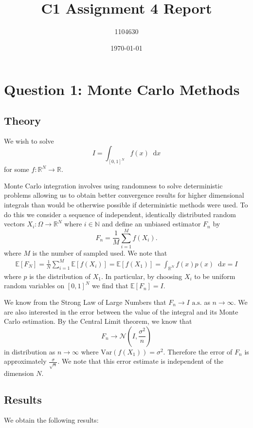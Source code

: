 \documentclass[letterpaper,12pt]{article}
\newcommand{\R}{\ensuremath{\mathbb{R}}}
\newcommand{\N}{\mathbb{N}}
\newcommand{\E}{\mathbb{E}}
\newcommand*{\diff}{\mathop{}\!\mathrm{d}}
\begin{document}
\title{C1 Assignment 4 Report}
\author{1104630}
\date{\today}
\maketitle


\section{Question 1: Monte Carlo Methods}

\subsection{Theory}

We wish to solve
\[
I = \int_{[ 0 , 1 ] ^N} f(x) \diff x
\]
for some $f : \R^N \to \R$.

Monte Carlo integration involves using randomness to solve deterministic problems allowing us to obtain better convergence results for higher dimensional integrals than would be otherwise possible if deterministic methods were used. To do this we consider a sequence of independent, identically distributed random vectors $X_i : \Omega \to \R^N$ where $i \in \N$ and define an unbiased estimator $F_n$ by
\[
F_n = \frac{1}{M} \sum_{i = 1}^{M} f(X_i).
\]
where $M$ is the number of sampled used. We note that
\begin{align*}
\E[F_N] = \frac{1}{N} \sum_{i = 1}^{M} \E [f(X_i)] = \E[f(X_1)] = \int_{\R^N} f(x)p(x) \diff x = I
\end{align*}
where $p$ is the distribution of $X_1$. In particular, by choosing $X_i$ to be uniform random variables on $[0 , 1]^N$ we find that $\E[F_n] = I$. 

We know from the Strong Law of Large Numbers that $F_n \to I \text{ a.s.}$ as $n \to \infty$. We are also interested in the error between the value of the integral and its Monte Carlo estimation. By the Central Limit theorem, we know that
\[
F_n \to \mathcal{N}(I , \frac{\sigma^2}{n} )
\]
in distribution as $n \to \infty$ where $\text{Var}(f(X_1)) = \sigma^2$. Therefore the error of $F_n$ is approximately $\frac{\sigma}{\sqrt{n}}$. We note that this error estimate is independent of the dimension $N$.

\subsection{Results}

We obtain the following results:
\end{document}
